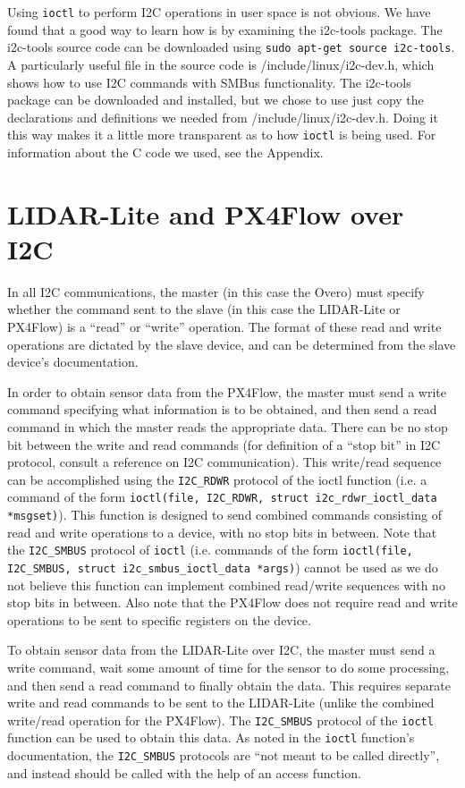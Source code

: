 \documentclass[10pt]{article}
\begin{document}
Using \texttt{ioctl} to perform I2C operations in user space is not obvious. We have found that a good way to learn how is by examining the i2c-tools package. The i2c-tools source code can be downloaded using \texttt{sudo apt-get source i2c-tools}.
A particularly useful file in the source code is /include/linux/i2c-dev.h, which shows how to use I2C commands with SMBus functionality. The i2c-tools package can be downloaded and installed, but we chose to use just copy the declarations and definitions we needed from /include/linux/i2c-dev.h. Doing it this way makes it a little more transparent as to how \texttt{ioctl} is being used. For information about the C code we used, see the Appendix.

\section*{LIDAR-Lite and PX4Flow over I2C}
In all I2C communications, the master (in this case the Overo) must specify whether the command sent to the slave (in this case the LIDAR-Lite or PX4Flow) is a ``read'' or ``write'' operation. The format of these read and write operations are dictated by the slave device, and can be determined from the slave device's documentation.

In order to obtain sensor data from the PX4Flow, the master must send a write command specifying what information is to be obtained, and then send a read command in which the master reads the appropriate data. There can be no stop bit between the write and read commands (for definition of a ``stop bit'' in I2C protocol, consult a reference on I2C communication). This write/read sequence can be accomplished using the \texttt{I2C\_RDWR} protocol of the ioctl function (i.e. a command of the form \texttt{ioctl(file, I2C\_RDWR, struct i2c\_rdwr\_ioctl\_data *msgset)}). This function is designed to send combined commands consisting of read and write operations to a device, with no stop bits in between. Note that the \texttt{I2C\_SMBUS} protocol of \texttt{ioctl} (i.e. commands of the form \texttt{ioctl(file, I2C\_SMBUS, struct i2c\_smbus\_ioctl\_data *args)}) cannot be used as we do not believe this function can implement combined read/write sequences with no stop bits in between. Also note that the PX4Flow does not require read and write operations to be sent to specific registers on the device.

To obtain sensor data from the LIDAR-Lite over I2C, the master must send a write command, wait some amount of time for the sensor to do some processing, and then send a read command to finally obtain the data. This requires separate write and read commands to be sent to the LIDAR-Lite (unlike the combined write/read operation for the PX4Flow). The \texttt{I2C\_SMBUS} protocol of the \texttt{ioctl} function can be used to obtain this data. As noted in the \texttt{ioctl} function's documentation, the \texttt{I2C\_SMBUS} protocols are ``not meant to be called directly'', and instead should be called with the help of an access function. 
\end{document}
